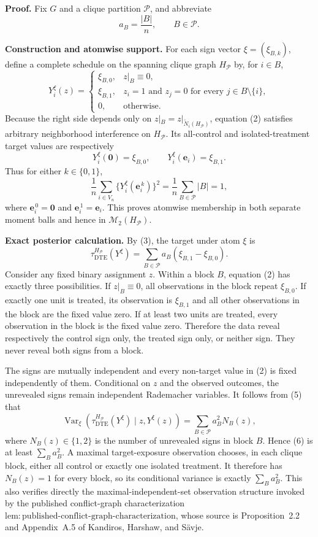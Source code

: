 \textbf{Proof.}
Fix \(G\) and a clique partition \(\mathcal P\), and abbreviate
\[
a_B=\frac{|B|}{n},\qquad B\in\mathcal P.
\tag{1}
\]

\textbf{Construction and atomwise support.}
For each sign vector \(\xi=(\xi_{B,k})\), define a complete schedule on the spanning clique graph \(H_{\mathcal P}\) by, for \(i\in B\),
\[
Y_i^{\xi}(z)=
\begin{cases}
\xi_{B,0},&z|_B\equiv0,\\
\xi_{B,1},&z_i=1\text{ and }z_j=0\text{ for every }j\in B\setminus\{i\},\\
0,&\text{otherwise}.
\end{cases}
\tag{2}
\]
Because the right side depends only on \(z|_B=z|_{\widetilde N_i(H_{\mathcal P})}\), equation (2) satisfies arbitrary neighborhood interference on \(H_{\mathcal P}\). Its all-control and isolated-treatment target values are respectively
\[
Y_i^{\xi}(\mathbf0)=\xi_{B,0},
\qquad
Y_i^{\xi}(\mathbf e_i)=\xi_{B,1}.
\tag{3}
\]
Thus for either \(k\in\{0,1\}\),
\[
\frac1n\sum_{i\in V_n}\{Y_i^{\xi}(\mathbf e_i^{\,k})\}^2
=\frac1n\sum_{B\in\mathcal P}|B|=1,
\tag{4}
\]
where \(\mathbf e_i^{\,0}=\mathbf0\) and \(\mathbf e_i^{\,1}=\mathbf e_i\). This proves atomwise membership in both separate moment balls and hence in \(\mathcal M_2(H_{\mathcal P})\).

\textbf{Exact posterior calculation.}
By (3), the target under atom \(\xi\) is
\[
\tau_{\mathrm{DTE}}^{H_{\mathcal P}}(Y^{\xi})
=\sum_{B\in\mathcal P}a_B(\xi_{B,1}-\xi_{B,0}).
\tag{5}
\]
Consider any fixed binary assignment \(z\). Within a block \(B\), equation (2) has exactly three possibilities. If \(z|_B\equiv0\), all observations in the block repeat \(\xi_{B,0}\). If exactly one unit is treated, its observation is \(\xi_{B,1}\) and all other observations in the block are the fixed value zero. If at least two units are treated, every observation in the block is the fixed value zero. Therefore the data reveal respectively the control sign only, the treated sign only, or neither sign. They never reveal both signs from a block.

The signs are mutually independent and every non-target value in (2) is fixed independently of them. Conditional on \(z\) and the observed outcomes, the unrevealed signs remain independent Rademacher variables. It follows from (5) that
\[
\operatorname{Var}_{\xi}\!\left(
\tau_{\mathrm{DTE}}^{H_{\mathcal P}}(Y^{\xi})
\mid z,Y^{\xi}(z)
\right)
=\sum_{B\in\mathcal P}a_B^2N_B(z),
\tag{6}
\]
where \(N_B(z)\in\{1,2\}\) is the number of unrevealed signs in block \(B\). Hence (6) is at least \(\sum_Ba_B^2\). A maximal target-exposure observation chooses, in each clique block, either all control or exactly one isolated treatment. It therefore has \(N_B(z)=1\) for every block, so its conditional variance is exactly \(\sum_Ba_B^2\). This also verifies directly the maximal-independent-set observation structure invoked by the published conflict-graph characterization \(\mathrm{lem{:}published\text{-}conflict\text{-}graph\text{-}characterization}\), whose source is Proposition~2.2 and Appendix~A.5 of Kandiros, Harshaw, and S\"avje.

